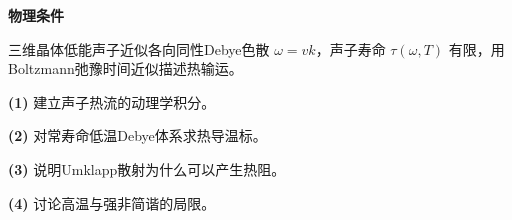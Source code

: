 \textbf{物理条件}\par 三维晶体低能声子近似各向同性Debye色散 \(\omega=vk\)，声子寿命 \(\tau(\omega,T)\) 有限，用Boltzmann弛豫时间近似描述热输运。
\par\noindent\textbf{(1)} 建立声子热流的动理学积分。
\par\noindent\textbf{(2)} 对常寿命低温Debye体系求热导温标。
\par\noindent\textbf{(3)} 说明Umklapp散射为什么可以产生热阻。
\par\noindent\textbf{(4)} 讨论高温与强非简谐的局限。
